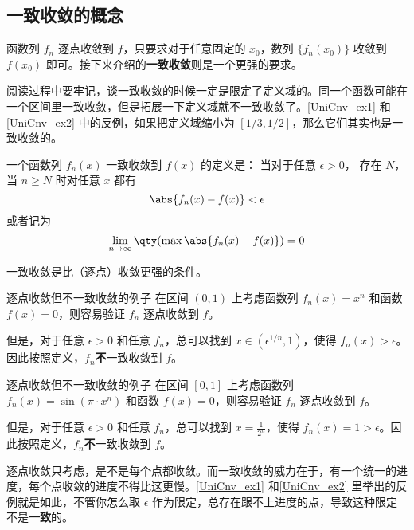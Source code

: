 



\subsection{一致收敛的概念}

函数列 $f_n$ 逐点收敛到 $f$，只要求对于任意固定的 $x_0$，数列 $\{f_n(x_0)\}$ 收敛到 $f(x_0)$ 即可。接下来介绍的\textbf{一致收敛}则是一个更强的要求。

阅读过程中要牢记，谈一致收敛的时候一定是限定了定义域的。同一个函数可能在一个区间里一致收敛，但是拓展一下定义域就不一致收敛了。\autoref{UniCnv_ex1} 和\autoref{UniCnv_ex2} 中的反例，如果把定义域缩小为 $[1/3, 1/2]$，那么它们其实也是一致收敛的。

一个函数列 $f_n(x)$ 一致收敛到 $f(x)$ 的定义是： 当对于任意 $\epsilon > 0$， 存在 $N$， 当 $n \geqslant N$ 时对任意 $x$ 都有
\begin{equation}\label{UniCnv_eq1}
\abs{f_n(x) - f(x)} < \epsilon
\end{equation}
或者记为
\begin{equation}
\lim_{n\to\infty} \qty(\max \abs{f_n(x) - f(x)}) = 0
\end{equation}

一致收敛是比（逐点）收敛更强的条件。

\begin{example}{逐点收敛但不一致收敛的例子}\label{UniCnv_ex1}
在区间 $(0, 1)$ 上考虑函数列 $f_n(x)=x^n$ 和函数 $f(x)=0$，则容易验证 $f_n$ 逐点收敛到 $f$。

但是，对于任意 $\epsilon>0$ 和任意 $f_n$，总可以找到 $x\in(\epsilon^{1/n}, 1)$，使得 $f_n(x)>\epsilon$。因此按照定义，$f_n$\textbf{不}一致收敛到 $f$。

\end{example}

\begin{example}{逐点收敛但不一致收敛的例子}\label{UniCnv_ex2}
在区间 $[0, 1]$ 上考虑函数列 $f_n(x)=\sin(\pi\cdot x^n)$ 和函数 $f(x)=0$，则容易验证 $f_n$ 逐点收敛到 $f$。

但是，对于任意 $\epsilon>0$ 和任意 $f_n$，总可以找到 $x=\frac{1}{2^n}$，使得 $f_n(x)=1>\epsilon$。因此按照定义，$f_n$\textbf{不}一致收敛到 $f$。

\end{example}

逐点收敛只考虑，是不是每个点都收敛。而一致收敛的威力在于，有一个统一的进度，每个点收敛的进度不得比这更慢。\autoref{UniCnv_ex1} 和\autoref{UniCnv_ex2} 里举出的反例就是如此，不管你怎么取 $\epsilon$ 作为限定，总存在跟不上进度的点，导致这种限定不是\textbf{一致}的。

